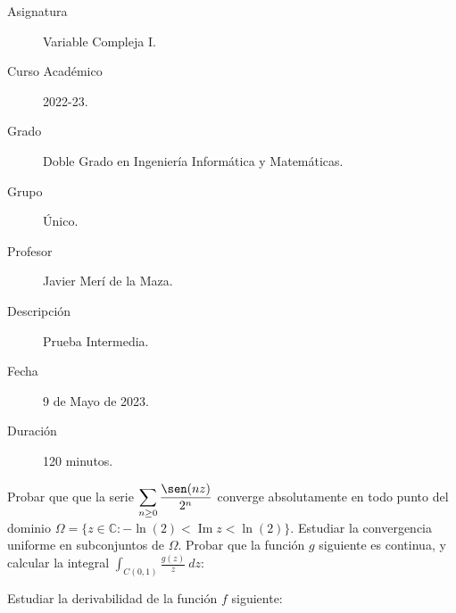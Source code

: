 \documentclass[12pt]{article}
\renewcommand{\Im}{\operatorname{Im}}
\begin{document}

    
    

    \begin{description}
        \item[Asignatura] Variable Compleja I.
        \item[Curso Académico] 2022-23.
        \item[Grado] Doble Grado en Ingeniería Informática y Matemáticas.
        \item[Grupo] Único.
        \item[Profesor] Javier Merí de la Maza.
        \item[Descripción] Prueba Intermedia.
        \item[Fecha] 9 de Mayo de 2023.
        \item[Duración] 120 minutos.
    
    \end{description}
    \newpage

    \begin{ejercicio}[4 puntos]
        Probar que que la serie $\displaystyle \sum_{n\geq 0} \frac{\sen(nz)}{2^n}$ converge absolutamente en todo punto del dominio $\Omega=\{z \in \mathbb{C} : -\ln(2) < \Im z < \ln(2)\}$. Estudiar la convergencia uniforme en subconjuntos de $\Omega$. Probar que la función $g$ siguiente es continua, y calcular la integral $\displaystyle \int_{C(0,1)} \frac{g(z)}{z}\ dz$:

    \end{ejercicio}

    \begin{ejercicio}[2 puntos]
        Estudiar la derivabilidad de la función $f$ siguiente:
    \end{ejercicio}
\end{document}
